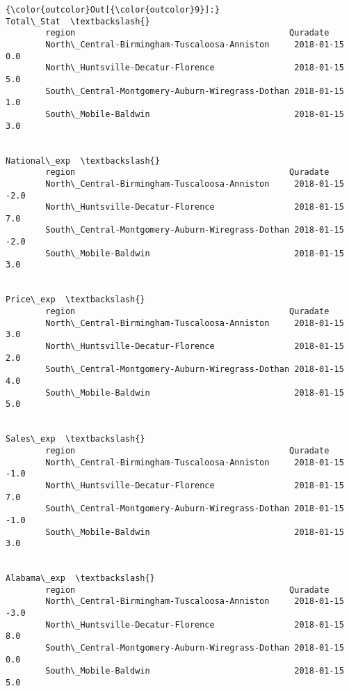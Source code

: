 \documentclass[11pt]{article}
\begin{document}
\begin{Verbatim}[commandchars=\\\{\}]
{\color{outcolor}Out[{\color{outcolor}9}]:}                                                              Total\_Stat  \textbackslash{}
        region                                           Quradate                 
        North\_Central-Birmingham-Tuscaloosa-Anniston     2018-01-15         0.0   
        North\_Huntsville-Decatur-Florence                2018-01-15         5.0   
        South\_Central-Montgomery-Auburn-Wiregrass-Dothan 2018-01-15         1.0   
        South\_Mobile-Baldwin                             2018-01-15         3.0   
        
                                                                     National\_exp  \textbackslash{}
        region                                           Quradate                   
        North\_Central-Birmingham-Tuscaloosa-Anniston     2018-01-15          -2.0   
        North\_Huntsville-Decatur-Florence                2018-01-15           7.0   
        South\_Central-Montgomery-Auburn-Wiregrass-Dothan 2018-01-15          -2.0   
        South\_Mobile-Baldwin                             2018-01-15           3.0   
        
                                                                     Price\_exp  \textbackslash{}
        region                                           Quradate                
        North\_Central-Birmingham-Tuscaloosa-Anniston     2018-01-15        3.0   
        North\_Huntsville-Decatur-Florence                2018-01-15        2.0   
        South\_Central-Montgomery-Auburn-Wiregrass-Dothan 2018-01-15        4.0   
        South\_Mobile-Baldwin                             2018-01-15        5.0   
        
                                                                     Sales\_exp  \textbackslash{}
        region                                           Quradate                
        North\_Central-Birmingham-Tuscaloosa-Anniston     2018-01-15       -1.0   
        North\_Huntsville-Decatur-Florence                2018-01-15        7.0   
        South\_Central-Montgomery-Auburn-Wiregrass-Dothan 2018-01-15       -1.0   
        South\_Mobile-Baldwin                             2018-01-15        3.0   
        
                                                                     Alabama\_exp  \textbackslash{}
        region                                           Quradate                  
        North\_Central-Birmingham-Tuscaloosa-Anniston     2018-01-15         -3.0   
        North\_Huntsville-Decatur-Florence                2018-01-15          8.0   
        South\_Central-Montgomery-Auburn-Wiregrass-Dothan 2018-01-15          0.0   
        South\_Mobile-Baldwin                             2018-01-15          5.0   
        

\end{Verbatim}
\end{document}

